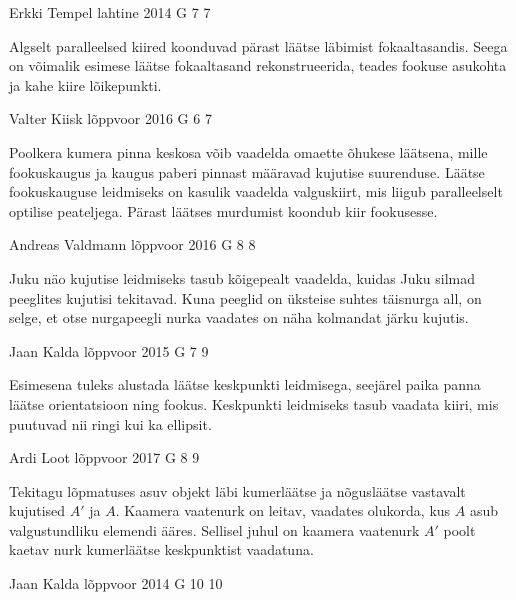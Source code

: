 \documentclass[11pt]{article}
\begin{document}
{%
{Erkki Tempel} %
{lahtine} %
{2014} %
{G 7} %
{7} %
{

\ifHint
Algselt paralleelsed kiired koonduvad pärast läätse läbimist fokaaltasandis. Seega on võimalik esimese läätse fokaaltasand rekonstrueerida, teades fookuse asukohta ja kahe kiire lõikepunkti.
\fi
}

{Valter Kiisk} %
{lõppvoor} %
{2016} %
{G 6} %
{7} %
{

\ifHint
Poolkera kumera pinna keskosa võib vaadelda omaette õhukese läätsena, mille fookuskaugus ja kaugus paberi pinnast määravad kujutise suurenduse. Läätse fookuskauguse leidmiseks on kasulik vaadelda valguskiirt, mis liigub paralleelselt optilise peateljega. Pärast läätses murdumist koondub kiir fookusesse.
\fi
}

{Andreas Valdmann} %
{lõppvoor} %
{2016} %
{G 8} %
{8} %
{

\ifHint
Juku näo kujutise leidmiseks tasub kõigepealt vaadelda, kuidas Juku silmad peeglites kujutisi tekitavad. Kuna peeglid on üksteise suhtes täisnurga all, on selge, et otse nurgapeegli nurka vaadates on näha kolmandat järku kujutis.
\fi
}

{Jaan Kalda} %
{lõppvoor} %
{2015} %
{G 7} %
{9} %
{

\ifHint
Esimesena tuleks alustada läätse keskpunkti leidmisega, seejärel paika panna läätse orientatsioon ning fookus. Keskpunkti leidmiseks tasub vaadata kiiri, mis puutuvad nii ringi kui ka ellipsit.
\fi
}

{Ardi Loot} %
{lõppvoor} %
{2017} %
{G 8} %
{9} %
{

\ifHint
Tekitagu lõpmatuses asuv objekt läbi kumerläätse ja nõgusläätse vastavalt kujutised $A'$ ja $A$. Kaamera vaatenurk on leitav, vaadates olukorda, kus $A$ asub valgustundliku elemendi ääres. Sellisel juhul on kaamera vaatenurk $A'$ poolt kaetav nurk kumerläätse keskpunktist vaadatuna.
\fi
}

{Jaan Kalda} %
{lõppvoor} %
{2014} %
{G 10} %
{10} %
{

}}
\end{document}

